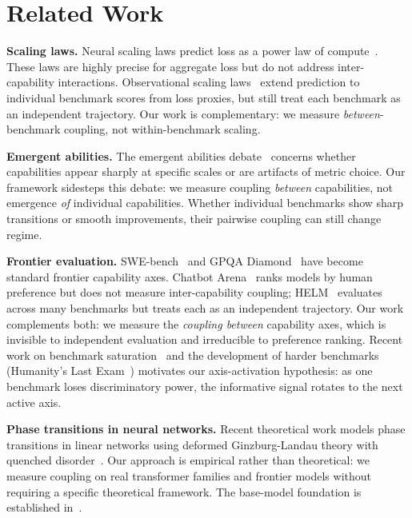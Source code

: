 \documentclass{article}
\begin{document}
\section{Related Work}
\label{sec:related}

\textbf{Scaling laws.}
Neural scaling laws predict loss as a power law of compute~\cite{kaplan2020,chinchilla2022}.
These laws are highly precise for aggregate loss but do not address inter-capability interactions.
Observational scaling laws~\cite{ruan2024} extend prediction to individual benchmark scores
from loss proxies, but still treat each benchmark as an independent trajectory.
Our work is complementary: we measure \emph{between}-benchmark coupling, not within-benchmark scaling.

\textbf{Emergent abilities.}
The emergent abilities debate~\cite{wei2022,schaeffer2023} concerns whether capabilities
appear sharply at specific scales or are artifacts of metric choice.
Our framework sidesteps this debate: we measure coupling \emph{between} capabilities,
not emergence \emph{of} individual capabilities.
Whether individual benchmarks show sharp transitions or smooth improvements,
their pairwise coupling can still change regime.

\textbf{Frontier evaluation.}
SWE-bench~\cite{jimenez2024} and GPQA Diamond~\cite{rein2024} have become standard
frontier capability axes.
Chatbot Arena~\cite{chiang2024chatbot} ranks models by human preference but does not
measure inter-capability coupling;
HELM~\cite{liang2023helm} evaluates across many benchmarks but treats each as
an independent trajectory.
Our work complements both: we measure the \emph{coupling between} capability axes,
which is invisible to independent evaluation and irreducible to preference ranking.
Recent work on benchmark saturation~\cite{kiela2021} and the development of harder
benchmarks (Humanity's Last Exam~\cite{hle2025}) motivates our axis-activation hypothesis:
as one benchmark loses discriminatory power, the informative signal rotates
to the next active axis.

\textbf{Phase transitions in neural networks.}
Recent theoretical work models phase transitions in linear networks using deformed
Ginzburg-Landau theory with quenched disorder~\cite{arolafernandez2024collective}.
Our approach is empirical rather than theoretical: we measure coupling on real transformer
families and frontier models without requiring a specific theoretical framework.
The base-model foundation is established in~\cite{amin2026lying}.
\end{document}
